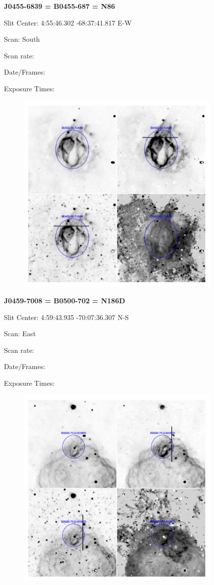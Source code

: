 \documentclass[11pt]{article}
\begin{document}
\newpage
{\bf J0455-6839 = B0455-687 = N86}

Slit Center:   4:55:46.302    -68:37:41.817     E-W

Scan:  South

Scan rate:  

Date/Frames:

Exposure Times:  

\begin{figure}
\includegraphics[width=10.05cm]{snapshots/B0455-687.png}
\end{figure}


\newpage
{\bf J0459-7008 = B0500-702 = N186D}

Slit Center:   4:59:43.935    -70:07:36.307     N-S

Scan:  East

Scan rate:  

Date/Frames:

Exposure Times:  

\begin{figure}
\includegraphics[width=10.05cm]{snapshots/B0500-702.png}
\end{figure}
\end{document}
